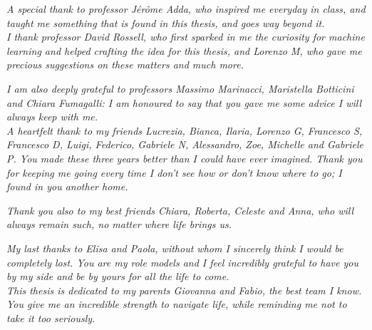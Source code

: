 


\textit{A special thank to professor Jérôme Adda, who inspired me everyday in class, and taught me something that is found in this thesis, and goes way beyond it. 
}
\\

\textit{I thank professor David Rossell, who first sparked in me the curiosity for machine learning and helped crafting the idea for this thesis, and Lorenzo M, who gave me precious suggestions on these matters and much more. }

\textit{I am also deeply grateful to professors Massimo Marinacci, Maristella Botticini and Chiara Fumagalli: I am honoured to say that you gave me some advice I will always keep with me. }\\

\textit{A heartfelt thank to my friends Lucrezia, Bianca, Ilaria, Lorenzo G, Francesco S, Francesco D, Luigi, Federico, Gabriele N, Alessandro, Zoe, Michelle and Gabriele P. You made these three years better than I could have ever imagined. Thank you for keeping me going every time I don't see how or don't know where to go; I found in you another home.}

\textit{
Thank you also to my best friends Chiara, Roberta, Celeste and Anna, who will always remain such, no matter where life brings us.}

\textit{My last thanks to Elisa and Paola, without whom I sincerely think I would be completely lost. You are my role models and I feel incredibly grateful to have you by my side and be by yours for all the life to come.}\\


\textit{This thesis is dedicated to my parents Giovanna and Fabio, the best team I know. You give me an incredible strength to navigate life, while reminding me not to take it too seriously.}


